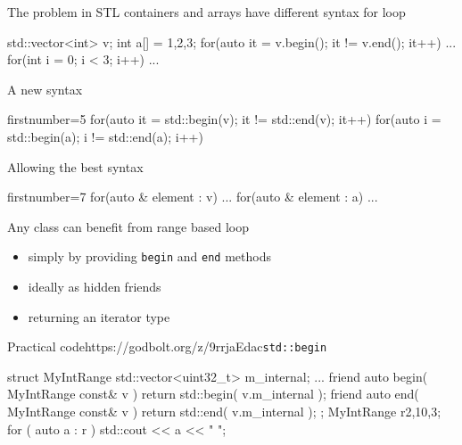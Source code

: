 \begin{frame}[fragile]
  \begin{alertblock}{The problem in }
    STL containers and arrays have different syntax for loop
    \vspace{-1mm}
    \begin{cppcode*}{}
      std::vector<int> v;
      int a[] = {1,2,3};
      for(auto it = v.begin(); it != v.end(); it++) {...}
      for(int i = 0; i < 3; i++) {...}
    \end{cppcode*}
  \end{alertblock}
  \pause
  \begin{block}{A new syntax}
    \begin{cppcode*}{firstnumber=5}
      for(auto it = std::begin(v); it != std::end(v); it++)
      for(auto i = std::begin(a); i != std::end(a); i++)
    \end{cppcode*}
  \end{block}
  \pause
  \begin{exampleblock}{Allowing the best syntax}
    \begin{cppcode*}{firstnumber=7}
      for(auto & element : v) {...}
      for(auto & element : a) {...}
    \end{cppcode*}
  \end{exampleblock}
\end{frame}

\begin{frame}[fragile]
  \begin{block}{Any class can benefit from range based loop}
    \begin{itemize}
    \item simply by providing \texttt{begin} and \texttt{end} methods
    \item ideally as hidden friends
    \item returning an iterator type
    \end{itemize}
  \end{block}
  \begin{exampleblockGB}{Practical code}{https://godbolt.org/z/9rrjaEdac}{\texttt{std::begin}}
    \scriptsize
    \begin{cppcode*}{}
  struct MyIntRange {
    std::vector<uint32_t> m_internal;
    ...
    friend auto begin( MyIntRange const& v ) {
      return std::begin( v.m_internal );
    }
    friend auto end( MyIntRange const& v ) {
      return std::end( v.m_internal );
    }
  };
  MyIntRange r{2,10,3};
  for ( auto a : r ) {
    std::cout << a << " ";
  }
    \end{cppcode*}
  \end{exampleblockGB}
\end{frame}

